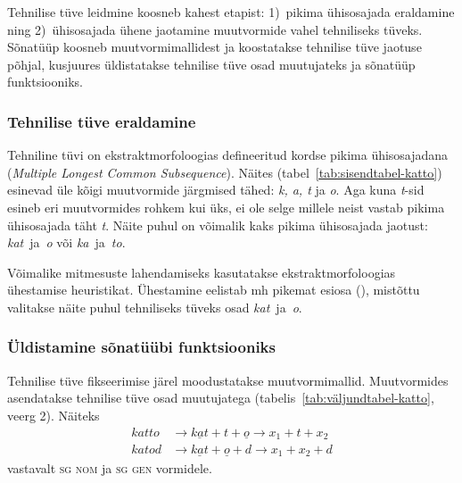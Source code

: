 \documentclass[12pt,a4paper]{article}
\newcommand{\vadja}[1]{\textit{#1}}
\newcommand{\msd}[1]{\textsc{#1}}
\begin{document}
Tehnilise tüve leidmine koosneb kahest etapist: 1)~pikima ühisosajada eraldamine ning 2)~ühisosajada ühene jaotamine muutvormide vahel tehniliseks tüveks. Sõnatüüp koosneb muutvormimallidest ja koostatakse tehnilise tüve jaotuse põhjal, kusjuures üldistatakse tehnilise tüve osad muutujateks ja sõnatüüp funktsiooniks.


\subsubsection{Tehnilise tüve eraldamine}

Tehniline tüvi on ekstraktmorfoloogias defineeritud kordse pikima ühisosajadana (\textit{Multiple Longest Common Subsequence}). %
Näites (tabel~\ref{tab:sisendtabel-katto}) esinevad üle kõigi muutvormide järgmised tähed: \vadja{k, a, t} ja \vadja{o}. Aga kuna \textit{t}-sid esineb eri muutvormides rohkem kui üks, ei ole selge millele neist vastab pikima ühisosajada täht \textit{t}.  Näite puhul on võimalik kaks pikima ühisosajada jaotust: \textit{kat}~ja~\textit{o} või \textit{ka}~ja~\textit{to}.

Võimalike mitmesuste lahendamiseks kasutatakse ekstraktmorfoloogias ühestamise heuristikat. %
Ühestamine eelistab mh pikemat esiosa (\cite[33]{hulden_generalizing_2014}), mistõttu valitakse näite puhul tehniliseks tüveks osad \textit{kat}~ja~\textit{o}.


\subsubsection{Üldistamine sõnatüübi funktsiooniks}

Tehnilise tüve fikseerimise järel moodustatakse muutvormi\-mallid. Muutvormides asendatakse tehnilise tüve osad muutujatega (tabelis~\ref{tab:väljundtabel-katto}, veerg 2). Näiteks
\begin{align*}
  \textit{katto} &\rightarrow \underline{\textit{kat}} + \textit{t} + \underline{\textit{o}} \rightarrow x_1 + t + x_2 \nonumber \\
  \textit{katod} &\rightarrow \underline{\textit{kat}} + \underline{\textit{o}} + \textit{d} \rightarrow x_1 + x_2 + d \nonumber
\end{align*}
vastavalt \msd{sg nom} ja \msd{sg gen} vormidele.
\end{document}
